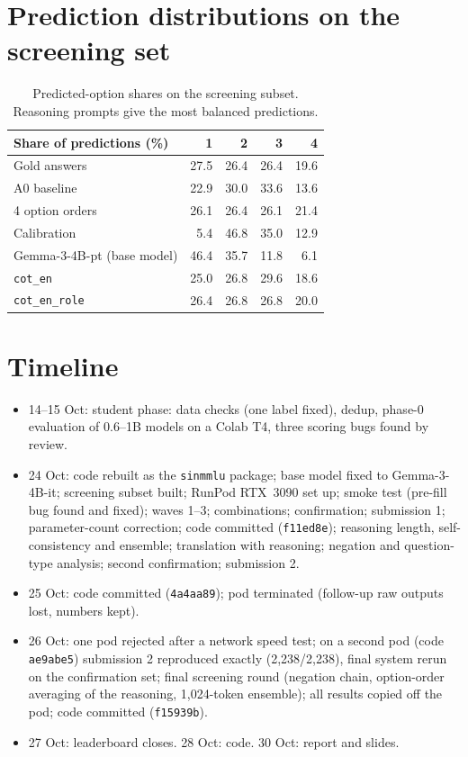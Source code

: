 \documentclass[10pt,a4paper]{article}
\newcommand{\cond}[1]{\texttt{#1}}
\begin{document}
\section{Prediction distributions on the screening set}
\begin{table}[h]
\centering\small
\begin{tabular}{lrrrr}
\toprule
Share of predictions (\%) & 1 & 2 & 3 & 4\\
\midrule
Gold answers & 27.5 & 26.4 & 26.4 & 19.6\\
A0 baseline & 22.9 & 30.0 & 33.6 & 13.6\\
4 option orders & 26.1 & 26.4 & 26.1 & 21.4\\
Calibration & 5.4 & 46.8 & 35.0 & 12.9\\
Gemma-3-4B-pt (base model) & 46.4 & 35.7 & 11.8 & 6.1\\
\cond{cot\_en} & 25.0 & 26.8 & 29.6 & 18.6\\
\cond{cot\_en\_role} & 26.4 & 26.8 & 26.8 & 20.0\\
\bottomrule
\end{tabular}
\caption{Predicted-option shares on the screening subset. Reasoning prompts give the most balanced predictions.}
\end{table}

\section{Timeline}
\begin{itemize}
\item 14--15 Oct: student phase: data checks (one label fixed), dedup, phase-0 evaluation of 0.6--1B models on a
Colab T4, three scoring bugs found by review.
\item 24 Oct: code rebuilt as the \texttt{sinmmlu} package; base model fixed to Gemma-3-4B-it; screening subset built;
RunPod RTX~3090 set up; smoke test (pre-fill bug found and fixed); waves 1--3; combinations; confirmation;
submission 1; parameter-count correction; code committed (\texttt{f11ed8e}); reasoning length, self-consistency and
ensemble; translation with reasoning; negation and question-type analysis; second confirmation; submission 2.
\item 25 Oct: code committed (\texttt{4a4aa89}); pod terminated (follow-up raw outputs lost, numbers kept).
\item 26 Oct: one pod rejected after a network speed test; on a second pod (code \texttt{ae9abe5}) submission 2
reproduced exactly (2,238/2,238), final system rerun on the confirmation set; final screening round (negation chain,
option-order averaging of the reasoning, 1,024-token ensemble); all results copied off the pod; code committed
(\texttt{f15939b}).
\item 27 Oct: leaderboard closes. 28 Oct: code. 30 Oct: report and slides.
\end{itemize}
\end{document}

